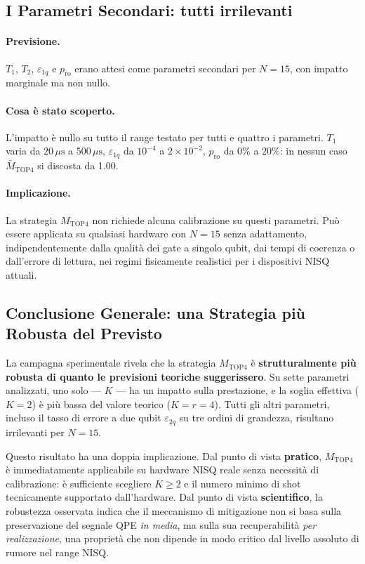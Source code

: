 \begin{onehalfspace}
\subsection{I Parametri Secondari: tutti irrilevanti}

\paragraph{Previsione.}
$T_1$, $T_2$, $\varepsilon_{1q}$ e $p_{\text{ro}}$ erano attesi come parametri secondari per $N=15$, con impatto marginale ma non nullo.

\paragraph{Cosa è stato scoperto.}
L'impatto è nullo su tutto il range testato per tutti e quattro i parametri. $T_1$ varia da $20\,\mu\text{s}$ a $500\,\mu\text{s}$, $\varepsilon_{1q}$ da $10^{-4}$ a $2\times10^{-2}$, $p_{\text{ro}}$ da $0\%$ a $20\%$: in nessun caso $\bar{M}_{\text{TOP4}}$ si discosta da 1.00.

\paragraph{Implicazione.}
La strategia $M_{\text{TOP4}}$ non richiede alcuna calibrazione su questi parametri. Può essere applicata su qualsiasi hardware con $N=15$ senza adattamento, indipendentemente dalla qualità dei gate a singolo qubit, dai tempi di coerenza o dall'errore di lettura, nei regimi fisicamente realistici per i dispositivi NISQ attuali.

\subsection{Conclusione Generale: una Strategia più Robusta del Previsto}

La campagna sperimentale rivela che la strategia $M_{\text{TOP4}}$ è \textbf{strutturalmente più robusta di quanto le previsioni teoriche suggerissero}. Su sette parametri analizzati, uno solo — $K$ — ha un impatto sulla prestazione, e la soglia effettiva ($K=2$) è più bassa del valore teorico ($K=r=4$). Tutti gli altri parametri, incluso il tasso di errore a due qubit $\varepsilon_{2q}$ su tre ordini di grandezza, risultano irrilevanti per $N=15$.

Questo risultato ha una doppia implicazione. Dal punto di vista \textbf{pratico}, $M_{\text{TOP4}}$ è immediatamente applicabile su hardware NISQ reale senza necessità di calibrazione: è sufficiente scegliere $K \geq 2$ e il numero minimo di shot tecnicamente supportato dall'hardware. Dal punto di vista \textbf{scientifico}, la robustezza osservata indica che il meccanismo di mitigazione non si basa sulla preservazione del segnale QPE \emph{in media}, ma sulla sua recuperabilità \emph{per realizzazione}, una proprietà che non dipende in modo critico dal livello assoluto di rumore nel range NISQ.



\end{onehalfspace}
